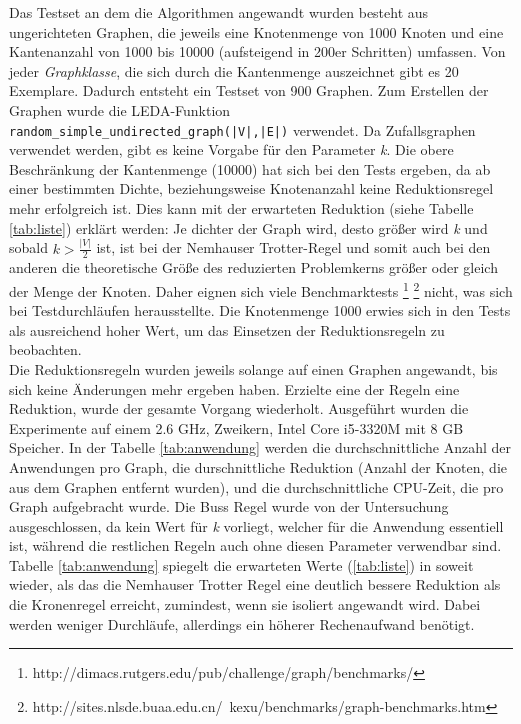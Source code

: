 Das Testset an dem die Algorithmen angewandt wurden besteht aus ungerichteten Graphen, die jeweils eine Knotenmenge von 1000 Knoten und eine Kantenanzahl von 1000 bis 10000 (aufsteigend in 200er Schritten) umfassen. Von jeder \emph{Graphklasse}, die sich durch die Kantenmenge auszeichnet gibt es 20 Exemplare. Dadurch entsteht ein Testset von 900 Graphen. Zum Erstellen der Graphen wurde die LEDA-Funktion \lstinline{random_simple_undirected_graph(|V|,|E|)} \cite{manual} verwendet. Da Zufallsgraphen verwendet werden, gibt es keine Vorgabe für den Parameter \emph{k}. Die obere Beschränkung der Kantenmenge (10000) hat sich bei den Tests ergeben, da ab einer bestimmten Dichte, beziehungsweise Knotenanzahl keine Reduktionsregel mehr erfolgreich ist. Dies kann mit der erwarteten Reduktion (siehe Tabelle \ref{tab:liste}) erklärt werden: Je dichter der Graph wird, desto größer wird \emph{k} und sobald $k>\frac{|V|}{2}$ ist, ist bei der Nemhauser Trotter-Regel und somit auch bei den anderen die theoretische Größe des reduzierten Problemkerns größer oder gleich der Menge der Knoten. Daher eignen sich viele Benchmarktests \footnote{http://dimacs.rutgers.edu/pub/challenge/graph/benchmarks/} \footnote{http://sites.nlsde.buaa.edu.cn/~kexu/benchmarks/graph-benchmarks.htm} nicht, was sich bei Testdurchläufen herausstellte. Die Knotenmenge 1000 erwies sich in den Tests als ausreichend hoher Wert, um das Einsetzen der Reduktionsregeln zu beobachten.\\
Die Reduktionsregeln wurden jeweils solange auf einen Graphen angewandt, bis sich keine Änderungen mehr ergeben haben. Erzielte eine der Regeln eine Reduktion, wurde der gesamte Vorgang wiederholt. Ausgeführt wurden die Experimente auf einem 2.6 GHz, Zweikern, Intel Core i5-3320M mit 8 GB Speicher. In der Tabelle \ref{tab:anwendung} werden die durchschnittliche Anzahl der Anwendungen pro Graph, die durschnittliche Reduktion (Anzahl der Knoten, die aus dem Graphen entfernt wurden), und die durchschnittliche CPU-Zeit, die pro Graph aufgebracht wurde. Die Buss Regel wurde von der Untersuchung ausgeschlossen, da kein Wert für \emph{k} vorliegt, welcher für die Anwendung essentiell ist, während die restlichen Regeln auch ohne diesen Parameter verwendbar sind.\\
Tabelle \ref{tab:anwendung} spiegelt die erwarteten Werte (\ref{tab:liste}) in soweit wieder, als das die Nemhauser Trotter Regel eine deutlich bessere Reduktion als die Kronenregel erreicht, zumindest, wenn sie isoliert angewandt wird. Dabei werden weniger Durchläufe, allerdings ein höherer Rechenaufwand benötigt. 

